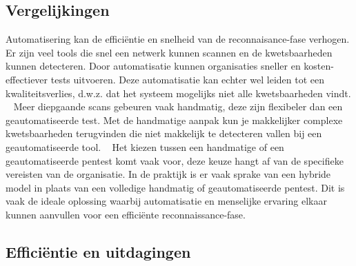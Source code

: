 \subsection{Vergelijkingen}

Automatisering kan de efficiëntie en snelheid van de reconnaisance-fase verhogen. Er zijn veel tools die snel een netwerk kunnen scannen 
en de kwetsbaarheden kunnen detecteren. Door automatisatie kunnen 
organisaties sneller en kosten-effectiever tests uitvoeren. Deze automatisatie kan echter wel leiden tot een kwaliteitsverlies, 
d.w.z. dat het systeem mogelijks niet alle kwetsbaarheden vindt. ~\autocite{peris}
Meer diepgaande scans gebeuren vaak handmatig, deze zijn flexibeler dan een geautomatiseerde test. 
Met de handmatige aanpak kun je makkelijker complexe kwetsbaarheden terugvinden die niet makkelijk te detecteren vallen bij 
een geautomatiseerde tool. ~\autocite{techtarget} 
Het kiezen tussen een handmatige of een geautomatiseerde pentest komt vaak voor, deze keuze hangt af van de specifieke  
vereisten van de organisatie. In de praktijk is er vaak sprake van een hybride model in plaats van een volledige handmatig of geautomatiseerde pentest.
Dit is vaak de ideale oplossing waarbij automatisatie en menselijke ervaring elkaar kunnen 
aanvullen voor een efficiënte reconnaissance-fase. ~\autocite{techtarget}

\subsection{Efficiëntie en uitdagingen}


